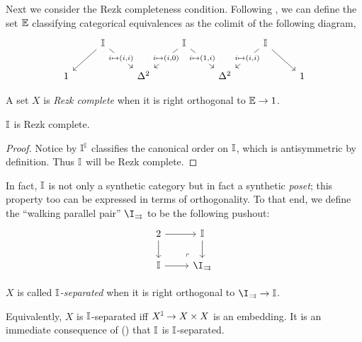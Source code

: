 Next we consider the Rezk completeness condition. Following \citet{buchholtz2021synthetic}, we can define the set $\mathbb{E}$ classifying categorical equivalences as the colimit of the following diagram,
\[
\begin{tikzcd}
	& \mbb{I} && \mbb{I} && \mbb{I} \\
	1 && {\Delta^2} && {\Delta^2} && 1
	\arrow[from=1-2, to=2-1]
	\arrow["{i \mapsto (i,i)}"{description}, from=1-2, to=2-3]
	\arrow["{i \mapsto (i,0)}"{description}, from=1-4, to=2-3]
	\arrow["{i \mapsto (1,i)}"{description}, from=1-4, to=2-5]
	\arrow["{i \mapsto (i,i)}"{description}, from=1-6, to=2-5]
	\arrow[from=1-6, to=2-7]
\end{tikzcd}
\]


\begin{definition}
  A set $X$ is \emph{Rezk complete} when it is right orthogonal to $\mathbb{E} \to 1$.
\end{definition}

\begin{proposition}[\AxiomSQCP]
  $\mathbb{I}$ is Rezk complete.
\end{proposition}
\begin{proof}
  Notice by  $\mathbb{I}^{\mathbb{I}}$ classifies the canonical order on $\mathbb{I}$, which is antisymmetric by definition. Thus $\mathbb{I}$ will be Rezk complete.
\end{proof}

In fact, $\mathbb{I}$ is not only a synthetic category but in fact a synthetic \emph{poset}; this property too can be expressed in terms of orthogonality. To that end, we define the ``walking parallel pair'' $\I_{\rightrightarrows}$ to be the following pushout:
\[
\begin{tikzcd}
  2 \ar[r] \ar[d] & \mbb{I} \ar[d] \\ 
  \mbb{I} \ar[r] & \I_{\rightrightarrows}
  \arrow["\lrcorner"{anchor=center, pos=0.125, rotate=180}, draw=none, from=2-2, to=1-1]
\end{tikzcd}
\]

\begin{definition}
  $X$ is called \emph{$\mathbb{I}$-separated} when it is right orthogonal to $\I_{\rightrightarrows} \to \mbb{I}$.
\end{definition}

Equivalently, $X$ is $\mathbb{I}$-separated iff $X^{\mathbb{I}} \to X \times X$ is an embedding. It is an immediate consequence of (\AxiomSQCP) that $\mathbb{I}$ is $\mathbb{I}$-separated.

